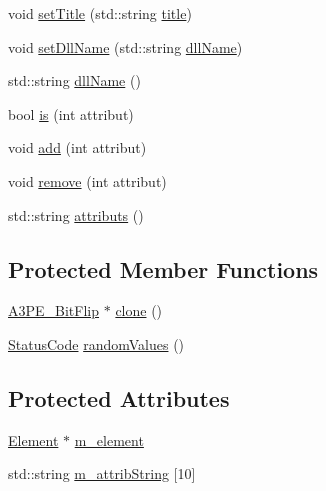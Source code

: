 \begin{DoxyCompactItemize}
\item 
void \hyperlink{classObject_a89557dbbad5bcaa02652f5d7fa35d20f}{set\+Title} (std\+::string \hyperlink{classObject_a73a0f1a41828fdd8303dd662446fb6c3}{title})
\item 
void \hyperlink{classObject_a870c5af919958c2136623b2d7816d123}{set\+Dll\+Name} (std\+::string \hyperlink{classObject_a2e3947f2870094c332d7454117f3ec63}{dll\+Name})
\item 
std\+::string \hyperlink{classObject_a2e3947f2870094c332d7454117f3ec63}{dll\+Name} ()
\item 
bool \hyperlink{classAttrib_a704f26af560909ad22065083bb7d4c34}{is} (int attribut)
\item 
void \hyperlink{classAttrib_a235f773af19c900264a190b00a3b4ad7}{add} (int attribut)
\item 
void \hyperlink{classAttrib_a7d4ef7e32d93cb287792b87b857e79f3}{remove} (int attribut)
\item 
std\+::string \hyperlink{classAttrib_aee7bbf16b144887f196e1341b24f8a26}{attributs} ()
\end{DoxyCompactItemize}
\subsection*{Protected Member Functions}
\begin{DoxyCompactItemize}
\item 
\hyperlink{classA3PE__BitFlip_1_1A3PE__BitFlip}{A3\+P\+E\+\_\+\+Bit\+Flip} $\ast$ \hyperlink{classA3PE__BitFlip_a444f2b4fd5211e457105f13d19795211}{clone} ()
\item 
\hyperlink{classStatusCode}{Status\+Code} \hyperlink{classA3PE__BitFlip_a57e668f5be18f8bc53f5c105735646bf}{random\+Values} ()
\end{DoxyCompactItemize}
\subsection*{Protected Attributes}
\begin{DoxyCompactItemize}
\item 
\hyperlink{classElement}{Element} $\ast$ \hyperlink{classProcessus_aa9d24d53c3e52f36786cabb5d8e296e7}{m\+\_\+element}
\item 
std\+::string \hyperlink{classAttrib_a3414521d7a82476e874b25a5407b5e63}{m\+\_\+attrib\+String} \mbox{[}10\mbox{]}
\end{DoxyCompactItemize}
